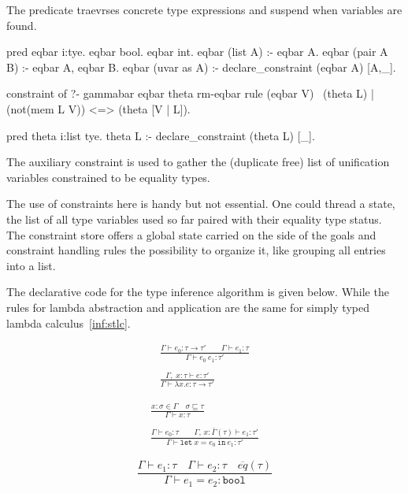 \documentclass[a4paper, 11pt]{book}
\begin{document}
The  predicate traevrses concrete type expressions and
suspend when variables are found.

\begin{elpicode}
pred eqbar i:tye.
eqbar bool.
eqbar int.
eqbar (list A) :- eqbar A.
eqbar (pair A B) :- eqbar A, eqbar B.
eqbar (uvar as A) :- declare_constraint (eqbar A) [A,_].

constraint of ?- gammabar eqbar theta rm-eqbar {
  rule (eqbar V) \ (theta L) | (not(mem L V)) <=> (theta [V | L]).
}

pred theta i:list tye.
theta L :- declare_constraint (theta L) [_].
\end{elpicode}

The auxiliary constraint  is used to gather the
(duplicate free) list of unification variables constrained to be equality types.

The use of constraints here is handy but not essential. One could thread a state,
the list of all type variables used so far paired with their equality type status.
The constraint store offers a global state carried on the side of the goals
and constraint handling rules the possibility to organize it, like grouping
all entries into a list.

The declarative code for the type inference algorithm is given below.
While the rules for lambda abstraction and application are the same
for simply typed lambda calculus~\ref{inf:stlc}.

\begin{center}
\begin{minipage}{0.45\textwidth}
$$
\begin{array}{cl}
  \displaystyle\frac{\Gamma \vdash e_0:\tau \rightarrow \tau' \quad\quad \Gamma \vdash e_1 : \tau }{\Gamma \vdash e_0\ e_1 : \tau'}\\ \\
  \displaystyle\frac{\Gamma,\;x:\tau\vdash e:\tau'}{\Gamma \vdash \lambda x.e : \tau \rightarrow \tau'}
\end{array}
  $$
\end{minipage}
\begin{minipage}{0.45\textwidth}
$$
\begin{array}{cl}
  \displaystyle\frac{x:\sigma \in \Gamma \quad \sigma \sqsubseteq \tau}{\Gamma \vdash x:\tau}\\ \\
  \displaystyle\frac{\Gamma \vdash e_0:\tau \quad\quad \Gamma,\,x:\bar{\Gamma}(\tau) \vdash e_1:\tau'}{\Gamma \vdash \mathtt{let}\ x = e_0\ \mathtt{in}\ e_1 :  \tau'}
  \end{array}
$$
\end{minipage}
$$ 
\displaystyle\frac{\Gamma \vdash e_1 : \tau \quad \Gamma \vdash e_2 : \tau \quad \overline{eq}(\tau)}{\Gamma \vdash e_1 = e_2: \mathtt{bool}}
$$
\end{center}
\end{document}

